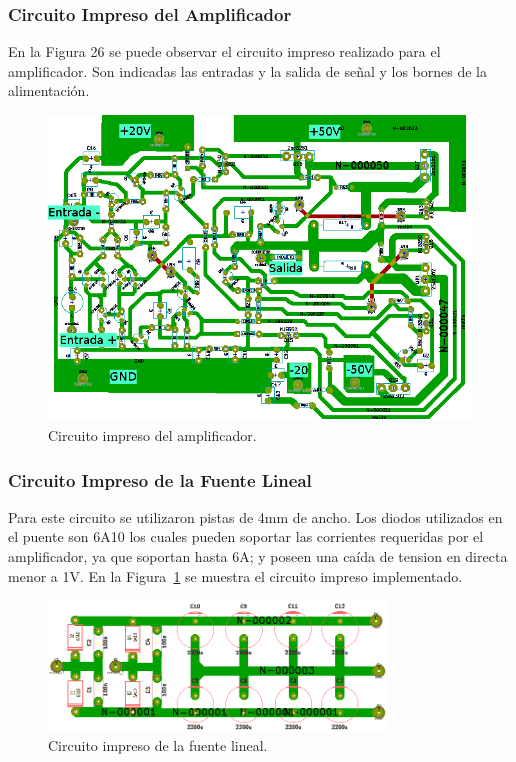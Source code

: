 \bigskip
\subsubsection{Circuito Impreso del Amplificador}

En la Figura 26 se puede observar el circuito impreso realizado para el amplificador. Son indicadas las entradas y la salida de señal y los bornes de la alimentación.
\medskip
\begin{figure}[H]
\centerline{
\includegraphics[width=1\textwidth]{img/PCB1.png}}
\caption{Circuito impreso del amplificador.}
\end{figure}

\bigskip
\subsubsection{Circuito Impreso de la Fuente Lineal}
\medskip
Para este circuito se utilizaron pistas de 4mm de ancho. Los diodos utilizados en el puente son 6A10 los cuales pueden soportar las corrientes requeridas por el amplificador, ya que soportan hasta 6A; y poseen una caída de tension en directa menor a 1V.
En la Figura~\ref{circuito_impreso_fuente_lineal} se muestra el circuito impreso implementado. 

\begin{figure}[H]
\centering
\centerline{\includegraphics[width=0.8\textwidth]{img/circuito_impreso_fuente_lineal.png}}
\caption{Circuito impreso de la fuente lineal.}
\label{circuito_impreso_fuente_lineal} 
\end{figure}
\bigskip
